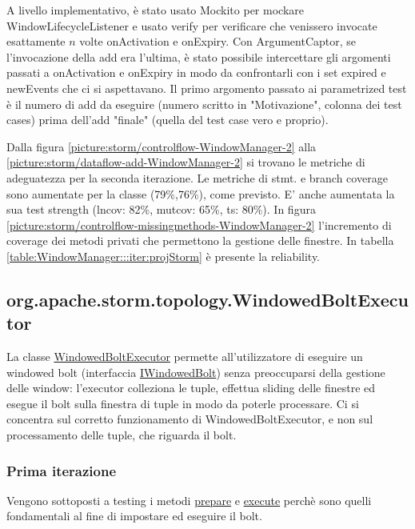 \documentclass[10pt, a4paper]{article}
\newcommand{\gettablelabel}[5]{table:#1:#2:#3:iter#4:proj#5}
\newcommand{\getreltablelabel}[2]{\gettablelabel{#1}{}{}{}{#2}}
\newcommand{\getpicturelabel}[1]{picture:#1}
\def\storm{Storm}
\begin{document}
	A livello implementativo, è stato usato Mockito per mockare WindowLifecycleListener e usato verify per 
	verificare che venissero invocate esattamente $n$ volte onActivation e onExpiry. Con ArgumentCaptor, 
	se l'invocazione della add era l'ultima, è stato possibile intercettare gli argomenti passati a onActivation e
	onExpiry in modo da confrontarli con i set expired e newEvents che ci si aspettavano.
	Il primo argomento passato ai parametrized test è il numero di add da eseguire 
	(numero scritto in "Motivazione", colonna dei test cases) prima dell'add "finale" 
	(quella del test case vero e proprio).
	
	Dalla figura \ref{\getpicturelabel{storm/controlflow-WindowManager-2}} alla 
	\ref{\getpicturelabel{storm/dataflow-add-WindowManager-2}} 
	si trovano le metriche di adeguatezza per la seconda iterazione. Le metriche di stmt. e
	branch coverage sono aumentate per la classe (79\%,76\%), come previsto. 
	E' anche aumentata la sua test 
	strength (lncov: 82\%, mutcov: 65\%, ts: 80\%). In figura 
	\ref{\getpicturelabel{storm/controlflow-missingmethods-WindowManager-2}} 
	l'incremento di coverage dei metodi privati che permettono la gestione delle finestre.
	In tabella \ref{\getreltablelabel{WindowManager}{\storm}} è presente la reliability.
	
	\subsection{org.apache.storm.topology.WindowedBoltExecutor}
	
	La classe \href{https://storm.apache.org/releases/2.6.2/javadocs/org/apache/storm/topology/WindowedBoltExecutor.html}
	{WindowedBoltExecutor} permette all'utilizzatore di eseguire un windowed bolt (interfaccia 
	\href{https://storm.apache.org/releases/2.6.2/javadocs/org/apache/storm/topology/IWindowedBolt.html}
	{IWindowedBolt}) senza preoccuparsi della gestione delle window: 
	l'executor colleziona le tuple, effettua sliding delle finestre ed esegue il bolt sulla finestra di tuple
	in modo da poterle processare. Ci si concentra sul corretto funzionamento di WindowedBoltExecutor, e non sul processamento
	delle tuple, che riguarda il bolt.
	
	\subsubsection{Prima iterazione}
	
	Vengono sottoposti a testing i metodi 
	\href{https://storm.apache.org/releases/2.6.2/javadocs/org/apache/storm/topology/WindowedBoltExecutor.html#prepare(java.util.Map,org.apache.storm.task.TopologyContext,org.apache.storm.task.OutputCollector)}
	{prepare} e 
	\href{https://storm.apache.org/releases/2.6.2/javadocs/org/apache/storm/topology/WindowedBoltExecutor.html#execute(org.apache.storm.tuple.Tuple)}
	{execute} perchè sono quelli fondamentali al fine di impostare ed eseguire il bolt.
	
\end{document}
